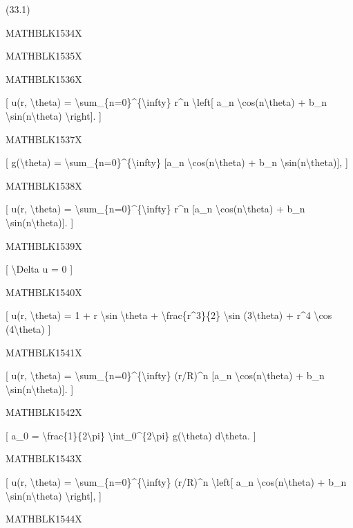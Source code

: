 \documentclass[
]{article}
\begin{document}
(33.1)

MATHBLK1534X

MATHBLK1535X

MATHBLK1536X

{[} u(r, \textbackslash theta) =
\textbackslash sum\_\{n=0\}\^{}\{\textbackslash infty\} r\^{}n
\textbackslash left{[} a\_n \textbackslash cos(n\textbackslash theta) +
b\_n \textbackslash sin(n\textbackslash theta) \textbackslash right{]}.
{]}

MATHBLK1537X

{[} g(\textbackslash theta) =
\textbackslash sum\_\{n=0\}\^{}\{\textbackslash infty\} {[}a\_n
\textbackslash cos(n\textbackslash theta) + b\_n
\textbackslash sin(n\textbackslash theta){]}, {]}

MATHBLK1538X

{[} u(r, \textbackslash theta) =
\textbackslash sum\_\{n=0\}\^{}\{\textbackslash infty\} r\^{}n {[}a\_n
\textbackslash cos(n\textbackslash theta) + b\_n
\textbackslash sin(n\textbackslash theta){]}. {]}

MATHBLK1539X

{[} \textbackslash Delta u = 0 {]}

MATHBLK1540X

{[} u(r, \textbackslash theta) = 1 + r \textbackslash sin
\textbackslash theta + \textbackslash frac\{r\^{}3\}\{2\}
\textbackslash sin (3\textbackslash theta) + r\^{}4 \textbackslash cos
(4\textbackslash theta) {]}

MATHBLK1541X

{[} u(r, \textbackslash theta) =
\textbackslash sum\_\{n=0\}\^{}\{\textbackslash infty\} (r/R)\^{}n
{[}a\_n \textbackslash cos(n\textbackslash theta) + b\_n
\textbackslash sin(n\textbackslash theta){]}. {]}

MATHBLK1542X

{[} a\_0 = \textbackslash frac\{1\}\{2\textbackslash pi\}
\textbackslash int\_0\^{}\{2\textbackslash pi\} g(\textbackslash theta)
d\textbackslash theta. {]}

MATHBLK1543X

{[} u(r, \textbackslash theta) =
\textbackslash sum\_\{n=0\}\^{}\{\textbackslash infty\} (r/R)\^{}n
\textbackslash left{[} a\_n \textbackslash cos(n\textbackslash theta) +
b\_n \textbackslash sin(n\textbackslash theta) \textbackslash right{]},
{]}

MATHBLK1544X
\end{document}
